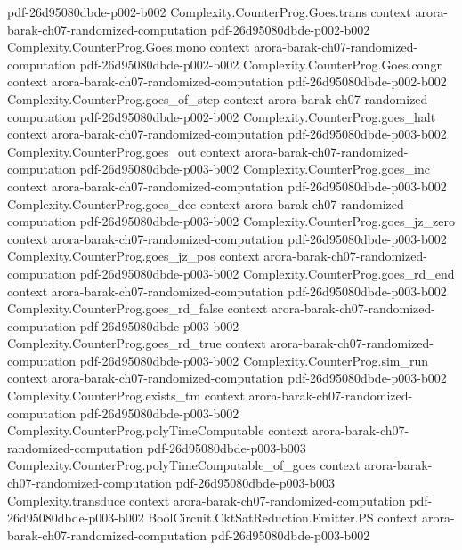 \begin{theorem}
  {pdf-26d95080dbde-p002-b002}
\proofstep
  {Complexity.CounterProg.Goes.trans}
  {context}
  {arora-barak-ch07-randomized-computation}
  {pdf-26d95080dbde-p002-b002}
\proofstep
  {Complexity.CounterProg.Goes.mono}
  {context}
  {arora-barak-ch07-randomized-computation}
  {pdf-26d95080dbde-p002-b002}
\proofstep
  {Complexity.CounterProg.Goes.congr}
  {context}
  {arora-barak-ch07-randomized-computation}
  {pdf-26d95080dbde-p002-b002}
\proofstep
  {Complexity.CounterProg.goes_of_step}
  {context}
  {arora-barak-ch07-randomized-computation}
  {pdf-26d95080dbde-p002-b002}
\proofstep
  {Complexity.CounterProg.goes_halt}
  {context}
  {arora-barak-ch07-randomized-computation}
  {pdf-26d95080dbde-p003-b002}
\proofstep
  {Complexity.CounterProg.goes_out}
  {context}
  {arora-barak-ch07-randomized-computation}
  {pdf-26d95080dbde-p003-b002}
\proofstep
  {Complexity.CounterProg.goes_inc}
  {context}
  {arora-barak-ch07-randomized-computation}
  {pdf-26d95080dbde-p003-b002}
\proofstep
  {Complexity.CounterProg.goes_dec}
  {context}
  {arora-barak-ch07-randomized-computation}
  {pdf-26d95080dbde-p003-b002}
\proofstep
  {Complexity.CounterProg.goes_jz_zero}
  {context}
  {arora-barak-ch07-randomized-computation}
  {pdf-26d95080dbde-p003-b002}
\proofstep
  {Complexity.CounterProg.goes_jz_pos}
  {context}
  {arora-barak-ch07-randomized-computation}
  {pdf-26d95080dbde-p003-b002}
\proofstep
  {Complexity.CounterProg.goes_rd_end}
  {context}
  {arora-barak-ch07-randomized-computation}
  {pdf-26d95080dbde-p003-b002}
\proofstep
  {Complexity.CounterProg.goes_rd_false}
  {context}
  {arora-barak-ch07-randomized-computation}
  {pdf-26d95080dbde-p003-b002}
\proofstep
  {Complexity.CounterProg.goes_rd_true}
  {context}
  {arora-barak-ch07-randomized-computation}
  {pdf-26d95080dbde-p003-b002}
\proofstep
  {Complexity.CounterProg.sim_run}
  {context}
  {arora-barak-ch07-randomized-computation}
  {pdf-26d95080dbde-p003-b002}
\proofstep
  {Complexity.CounterProg.exists_tm}
  {context}
  {arora-barak-ch07-randomized-computation}
  {pdf-26d95080dbde-p003-b002}
\proofstep
  {Complexity.CounterProg.polyTimeComputable}
  {context}
  {arora-barak-ch07-randomized-computation}
  {pdf-26d95080dbde-p003-b003}
\proofstep
  {Complexity.CounterProg.polyTimeComputable_of_goes}
  {context}
  {arora-barak-ch07-randomized-computation}
  {pdf-26d95080dbde-p003-b003}
\proofstep
  {Complexity.transduce}
  {context}
  {arora-barak-ch07-randomized-computation}
  {pdf-26d95080dbde-p003-b002}
\proofstep
  {BoolCircuit.CktSatReduction.Emitter.PS}
  {context}
  {arora-barak-ch07-randomized-computation}
  {pdf-26d95080dbde-p003-b002}

\end{theorem}

